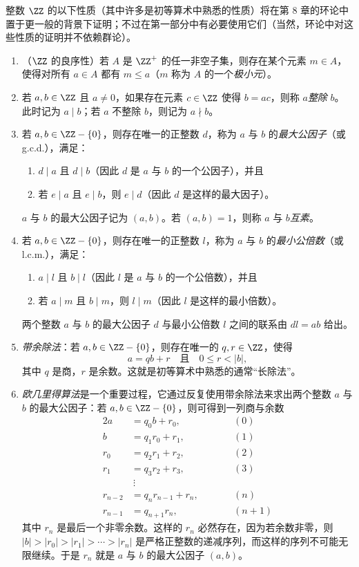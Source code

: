 整数 $\ZZ$ 的以下性质（其中许多是初等算术中熟悉的性质）将在第 8 章的环论中置于更一般的背景下证明；不过在第一部分中有必要使用它们（当然，环论中对这些性质的证明并不依赖群论）。
\begin{enumerate}[label=(\arabic*)]
  \item （$\ZZ$ 的良序性）若 $A$ 是 $\ZZ^+$ 的任一非空子集，则存在某个元素 $m\in A$，使得对所有 $a\in A$ 都有 $m\leq a$（$m$ 称为 $A$ 的一个\emph{极小元}）。
  \item 若 $a,b\in\ZZ$ 且 $a\neq0$，如果存在元素 $c\in\ZZ$ 使得 $b=ac$，则称 $a$\emph{整除} $b$。此时记为 $a\mid b$；若 $a$ 不整除 $b$，则记为 $a\nmid b$。
  \item 若 $a,b\in\ZZ-\{0\}$，则存在唯一的正整数 $d$，称为 $a$ 与 $b$ 的\emph{最大公因子}（或 g.c.d.），满足：
  \begin{enumerate}[label=(\alph*)]
    \item $d\mid a$ 且 $d\mid b$（因此 $d$ 是 $a$ 与 $b$ 的一个公因子），并且
    \item 若 $e\mid a$ 且 $e\mid b$，则 $e\mid d$（因此 $d$ 是这样的最大因子）。
  \end{enumerate}
  $a$ 与 $b$ 的最大公因子记为 $(a,b)$。若 $(a,b)=1$，则称 $a$ 与 $b$\emph{互素}。
  \item 若 $a,b\in\ZZ-\{0\}$，则存在唯一的正整数 $l$，称为 $a$ 与 $b$ 的\emph{最小公倍数}（或 l.c.m.），满足：
  \begin{enumerate}[label=(\alph*)]
    \item $a\mid l$ 且 $b\mid l$（因此 $l$ 是 $a$ 与 $b$ 的一个公倍数），并且
    \item 若 $a\mid m$ 且 $b\mid m$，则 $l\mid m$（因此 $l$ 是这样的最小倍数）。
  \end{enumerate}
  两个整数 $a$ 与 $b$ 的最大公因子 $d$ 与最小公倍数 $l$ 之间的联系由 $dl=ab$ 给出。
  \item \emph{带余除法}：若 $a,b\in\ZZ-\{0\}$，则存在唯一的 $q,r\in\ZZ$，使得
  \[
    a=qb+r\quad\text{且}\quad 0\leq r<|b|,
  \]
  其中 $q$ 是商，$r$ 是余数。这就是初等算术中熟悉的通常“长除法”。
  \item \emph{欧几里得算法}是一个重要过程，它通过反复使用带余除法来求出两个整数 $a$ 与 $b$ 的最大公因子：若 $a,b\in\ZZ-\{0\}$，则可得到一列商与余数
  \begin{alignat*}{2}
    a     &= q_0b+r_0,       &\qquad &(0)\\
    b     &= q_1r_0+r_1,     &&(1)\\
    r_0   &= q_2r_1+r_2,     &&(2)\\
    r_1   &= q_3r_2+r_3,     &&(3)\\
          &\ \vdots          &&\\
    r_{n-2}&=q_nr_{n-1}+r_n, &&(n)\\
    r_{n-1}&=q_{n+1}r_n,     &&(n+1)
  \end{alignat*}
  其中 $r_n$ 是最后一个非零余数。这样的 $r_n$ 必然存在，因为若余数非零，则 $|b|>|r_0|>|r_1|>\cdots>|r_n|$ 是严格正整数的递减序列，而这样的序列不可能无限继续。于是 $r_n$ 就是 $a$ 与 $b$ 的最大公因子 $(a,b)$。
\end{enumerate}

